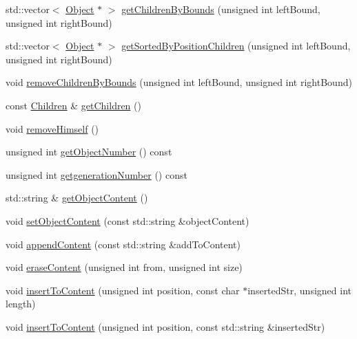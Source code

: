 \begin{DoxyCompactItemize}
\item 
std\-::vector$<$ \hyperlink{classmerge__lib_1_1_object}{Object} $\ast$ $>$ \hyperlink{classmerge__lib_1_1_object_a5d2c9017437a3c305cf458c859837fa6}{get\-Children\-By\-Bounds} (unsigned int left\-Bound, unsigned int right\-Bound)
\item 
std\-::vector$<$ \hyperlink{classmerge__lib_1_1_object}{Object} $\ast$ $>$ \hyperlink{classmerge__lib_1_1_object_a339dbecce58076f95648775141f7757f}{get\-Sorted\-By\-Position\-Children} (unsigned int left\-Bound, unsigned int right\-Bound)
\item 
void \hyperlink{classmerge__lib_1_1_object_aa894578e1dcaa8644e45c07639979b2a}{remove\-Children\-By\-Bounds} (unsigned int left\-Bound, unsigned int right\-Bound)
\item 
const \hyperlink{classmerge__lib_1_1_object_a4e1f3bf43d9fc39fea3829f7ae1da4a8}{Children} \& \hyperlink{classmerge__lib_1_1_object_aab580190b963beb33f2ad2c5241a9605}{get\-Children} ()
\item 
void \hyperlink{classmerge__lib_1_1_object_af9f1e80ed8aa6f0c515dc4cd52c51ddd}{remove\-Himself} ()
\item 
unsigned int \hyperlink{classmerge__lib_1_1_object_ad6b6bcffd9533e07678e2cb076dc2787}{get\-Object\-Number} () const 
\item 
unsigned int \hyperlink{classmerge__lib_1_1_object_a63d0ca3a029a3084e66ba862afd690c2}{getgeneration\-Number} () const 
\item 
std\-::string \& \hyperlink{classmerge__lib_1_1_object_ad441291610e8d87698139463d2a27d21}{get\-Object\-Content} ()
\item 
void \hyperlink{classmerge__lib_1_1_object_ac076f5b2afad955198104d6fcf2da7bd}{set\-Object\-Content} (const std\-::string \&object\-Content)
\item 
void \hyperlink{classmerge__lib_1_1_object_a0d95c2ed2314a0cb1c2d77e90a9f35b5}{append\-Content} (const std\-::string \&add\-To\-Content)
\item 
void \hyperlink{classmerge__lib_1_1_object_a21c04aa4fd032fef003e6aac6ab1212d}{erase\-Content} (unsigned int from, unsigned int size)
\item 
void \hyperlink{classmerge__lib_1_1_object_a365bdb9272a41c9f7f5f9525a03b981f}{insert\-To\-Content} (unsigned int position, const char $\ast$inserted\-Str, unsigned int length)
\item 
void \hyperlink{classmerge__lib_1_1_object_a77c59ebc8c0a2215be4ad5a76bb524c4}{insert\-To\-Content} (unsigned int position, const std\-::string \&inserted\-Str)

\end{DoxyCompactItemize}
